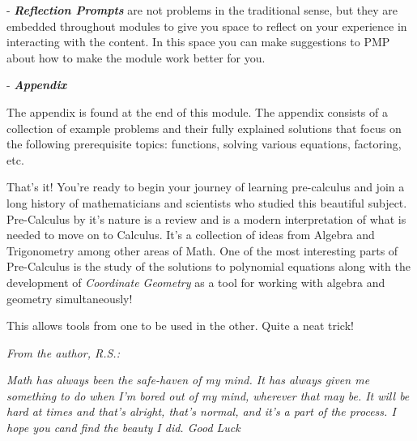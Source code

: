 \documentclass{amsart}
\numberwithin{equation}{section}
\theoremstyle{plain} %
\theoremstyle{definition}
\theoremstyle{remark}
\begin{document}
- \textbf{\textit{Reflection Prompts}} are not problems in the traditional sense, but they are embedded throughout modules to give you space to reflect on your experience in interacting with the content. In this space you can make suggestions to PMP about how to make the module work better for you.

- \textbf{\textit{Appendix}}

The appendix is found at the end of this module. The appendix consists of a collection of example problems and their fully explained solutions that focus on the following prerequisite topics:
functions, solving various equations, factoring, etc. 

\vspace{0.3cm}

That's it! You're ready to begin your journey of learning pre-calculus and join a long history of mathematicians and scientists who studied this beautiful subject. 
Pre-Calculus by it's nature is a review and is a modern interpretation of what is needed to move on to Calculus. It's a collection of ideas from Algebra and Trigonometry among other areas of Math. One of the most
interesting parts of Pre-Calculus is the study of the solutions to polynomial equations along with the development of \emph{Coordinate Geometry} as a tool for working with algebra and geometry simultaneously!

This allows tools from one to be used in the other. Quite a neat trick!

\newpage


\textit{From the author, R.S.:}%

\textit{\small Math has always been the safe-haven of my mind. It has always given me something to do when I'm bored out of my mind, wherever that may be. It will be hard at times and that's alright, that's normal, and it's a part of the process. I hope you cand find the beauty I did. Good Luck} %




\newpage


\tableofcontents





\newpage
\end{document}
